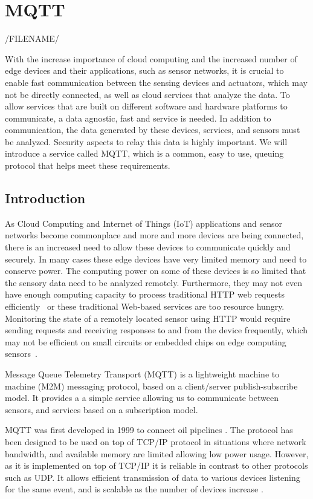 \chapter{MQTT}
\label{c:mqtt}

/FILENAME/

With the increase importance of cloud computing and the increased
number of edge devices and their applications, such as sensor
networks, it is crucial to enable fast communication between the
sensing devices and actuators, which may not be directly connected, as
well as cloud services that analyze the data. To allow services that
are built on different software and hardware platforms to communicate,
a data agnostic, fast and service is needed. In addition to
communication, the data generated by these devices, services, and
sensors must be analyzed. Security aspects to relay this data is
highly important. We will introduce a service called MQTT, which is a
common, easy to use, queuing protocol that helps meet these
requirements.  


\section{Introduction}

As Cloud Computing and Internet of Things (IoT) applications and
sensor networks become commonplace and more and more devices are being
connected, there is an increased need to allow these devices to
communicate quickly and securely. In many cases these edge devices
have very limited memory and need to conserve power. The computing
power on some of these devices is so limited that the sensory data
need to be analyzed remotely. Furthermore, they may not even have
enough computing capacity to process traditional HTTP web requests
efficiently~\cite{mqtt-vs-http}\cite{hivemq-website} or these traditional
Web-based services are too resource hungry. Monitoring the state of a
remotely located sensor using HTTP would require sending requests and
receiving responses to and from the device frequently, which may not
be efficient on small circuits or embedded chips on edge computing
sensors~\cite{mqtt-vs-http}.

Message Queue Telemetry Transport (MQTT) is a lightweight machine to
machine (M2M) messaging protocol, based on a client/server 
publish-subscribe model. It provides a a simple service allowing us to
communicate between sensors, and services based on a subscription
model.

MQTT was first developed in 1999 to connect oil pipelines
\cite{hivemq-website}. The protocol has been designed to be used on
top of TCP/IP protocol in situations where network bandwidth, and
available memory are limited allowing low power usage. However, as it
is implemented on top of TCP/IP it is reliable in contrast to other
protocols such as UDP. It allows efficient transmission of
data to various devices listening for the same event, and is scalable
as the number of devices increase
\cite{mqtt-wiki}\cite{mqtt-official}.

